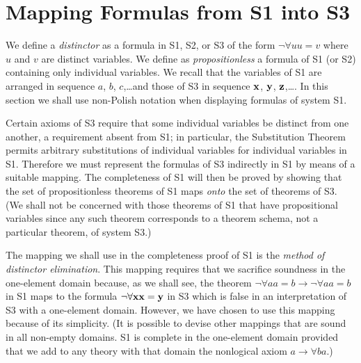 \documentclass[leqno]{article}
\begin{document}
\section{Mapping Formulas from S1 into S3}\label{mapping}

     We define a {\em distinctor} as a formula in S1, S2, or S3 of the form
$\lnot \forall uu=v$ where $u$ and $v$ are distinct variables.  We define as
{\em propositionless} a formula of S1 (or S2) containing only individual
variables.  We recall that the variables of S1 are arranged in sequence
$a$, $b$, $c$,\ldots and those of S3 in sequence ${\bf x}$, ${\bf y}$, ${\bf
z}$,\ldots .  In this section we shall use non-Polish notation when
displaying formulas of system S1.

     Certain axioms of S3 require that some individual variables be distinct
from one another, a requirement absent from S1; in particular, the
Substitution Theorem permits arbitrary substitutions of individual variables
for individual variables in S1.  Therefore we must represent the formulas of
S3 indirectly in S1 by means of a suitable mapping.  The completeness of S1
will then be proved by showing that the set of propositionless theorems of S1
maps {\em onto} the set of theorems of S3.  (We shall not be concerned with
those theorems of S1 that have propositional variables since any such theorem
corresponds to a theorem schema, not a particular theorem, of system S3.)

     The mapping we shall use in the completeness proof of S1 is the {\em
method of distinctor elimination}.  This mapping requires that we sacrifice
soundness in the one-element domain because, as we shall see, the theorem
$\lnot \forall aa=b\rightarrow \lnot \forall aa=b$ in S1 maps to the formula
$\lnot \forall {\bf x}{\bf x}={\bf y}$ in S3 which is false in an
interpretation of S3 with a one-element domain.  However, we have chosen to
use this mapping because of its simplicity.  (It is possible to devise other
mappings that are sound in all non-empty domains.  S1 is complete in the
one-element domain provided that we add to any theory with that domain the
nonlogical axiom $a\rightarrow \forall ba$.)
\end{document}
